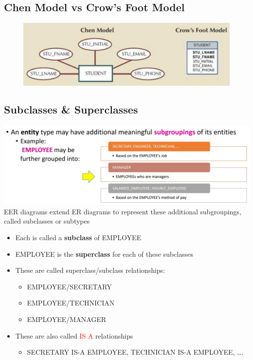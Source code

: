 \documentclass[a4paper, 12pt]{article}
\begin{document}
    \subsection{Chen Model vs Crow's Foot Model}
    \begin{figure}[H]
        \includegraphics[width=\textwidth]{chapter2c_8.png}
    \end{figure}

    \subsection{Subclasses \& Superclasses}
        \includegraphics[width=\textwidth]{chapter2c_1.png}
        EER diagrams extend ER diagrams to represent these additional
        subgroupings, called subclasses or subtypes
        \begin{itemize}
            \item Each is called a \textbf{subclass} of EMPLOYEE
            \item EMPLOYEE is the \textbf{superclass} for each of these subclasses
            \item These are called superclass/subclass relationships:
            \begin{itemize}
                \item EMPLOYEE/SECRETARY
                \item EMPLOYEE/TECHNICIAN
                \item EMPLOYEE/MANAGER
            \end{itemize}
            \item These are also called \textcolor{red}{IS A} relationships
            \begin{itemize}
                \item SECRETARY IS-A EMPLOYEE, TECHNICIAN IS-A EMPLOYEE, ….
            \end{itemize}
        \end{itemize}
\end{document}
